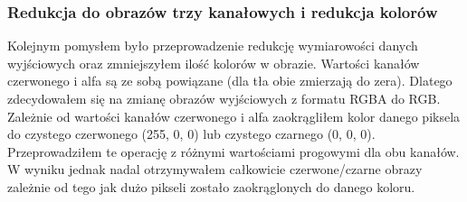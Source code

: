 \documentclass{article}
\begin{document}
\subsubsection{Redukcja do obrazów trzy kanałowych i redukcja kolorów}
Kolejnym pomysłem było przeprowadzenie redukcję wymiarowości danych wyjściowych oraz zmniejszyłem ilość kolorów w obrazie.
Wartości kanałów czerwonego i alfa są ze sobą powiązane (dla tła obie zmierzają do zera).
Dlatego zdecydowałem się na zmianę obrazów wyjściowych z formatu RGBA do RGB.
Zależnie od wartości kanałów czerwonego i alfa zaokrągliłem kolor danego piksela do czystego czerwonego (255, 0, 0) lub czystego czarnego (0, 0, 0).
Przeprowadziłem te operację z różnymi wartościami progowymi dla obu kanałów.
W wyniku jednak nadal otrzymywałem całkowicie czerwone/czarne obrazy zależnie od tego jak dużo pikseli zostało zaokrąglonych do danego koloru.
\end{document}
